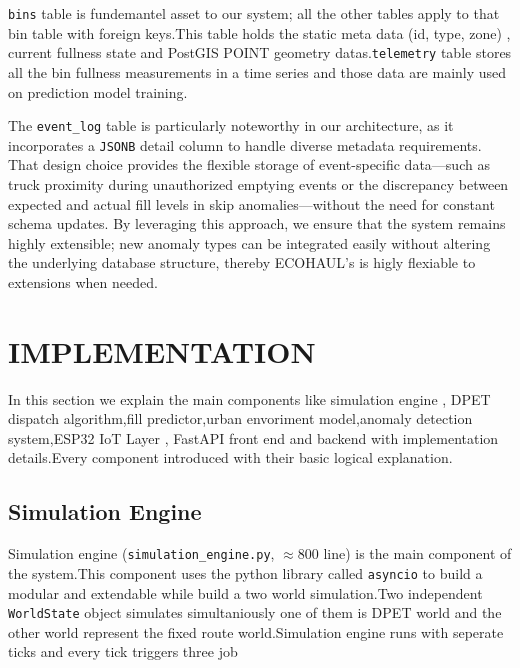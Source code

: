 \documentclass[12pt,a4paper]{report}
\begin{document}
\indent \texttt{bins} table is fundemantel asset to our system; all the other tables apply to that bin table with foreign keys.This table holds the static meta data (id, type, zone) , current fullness state and PostGIS POINT geometry datas.\texttt{telemetry} table stores all the bin fullness measurements in a time series and those data are mainly used on prediction model training.



\indent The \texttt{event\_log} table is particularly noteworthy in our architecture, as it incorporates a \texttt{JSONB} detail column to handle diverse metadata requirements. That design choice provides the flexible storage of event-specific data—such as truck proximity during unauthorized emptying events or the discrepancy between expected and actual fill levels in skip anomalies—without the need for constant schema updates. By leveraging this approach, we ensure that the system remains highly extensible; new anomaly types can be integrated easily without altering the underlying database structure, thereby ECOHAUL's is higly flexiable to extensions when needed.
\chapter{IMPLEMENTATION}

\indent In this section we explain the main components like simulation engine , DPET dispatch algorithm,fill predictor,urban envoriment model,anomaly detection system,ESP32 IoT Layer , FastAPI front end and backend with implementation details.Every component  introduced with their basic logical explanation.

\section{Simulation Engine}

\indent Simulation engine (\texttt{simulation\_engine.py}, $\approx$800 line) is the main component of the system.This component uses the python library called   \texttt{asyncio}  to build a modular and extendable while build a two world simulation.Two independent  \texttt{WorldState}  object simulates simultaniously  one of them is DPET world and the other world represent the fixed route world.Simulation engine runs with seperate ticks and every tick triggers three job
\end{document}
